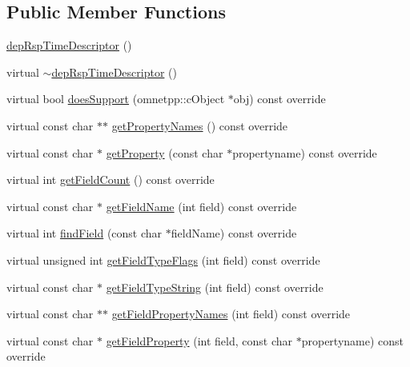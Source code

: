 \subsection*{Public Member Functions}
\begin{DoxyCompactItemize}
\item 
\hyperlink{classdep_rsp_time_descriptor_a1c9b594074be83beb7009019d66da91e}{dep\+Rsp\+Time\+Descriptor} ()
\item 
virtual \hyperlink{classdep_rsp_time_descriptor_a0cb36f001ae3e47a6d6156b8c7e66e19}{$\sim$dep\+Rsp\+Time\+Descriptor} ()
\item 
virtual bool \hyperlink{classdep_rsp_time_descriptor_ac514b2445c49b0a2fde22c730bdd8155}{does\+Support} (omnetpp\+::c\+Object $\ast$obj) const override
\item 
virtual const char $\ast$$\ast$ \hyperlink{classdep_rsp_time_descriptor_a3909adf8b159cd8da2cdb9aa135a77ba}{get\+Property\+Names} () const override
\item 
virtual const char $\ast$ \hyperlink{classdep_rsp_time_descriptor_a2426bb36989259be75b4ac3c7c18af5b}{get\+Property} (const char $\ast$propertyname) const override
\item 
virtual int \hyperlink{classdep_rsp_time_descriptor_ab44ba5e8986e63b20c2ced23f47a011c}{get\+Field\+Count} () const override
\item 
virtual const char $\ast$ \hyperlink{classdep_rsp_time_descriptor_a764ef69505cdeca4cefbda8aa3820bc3}{get\+Field\+Name} (int field) const override
\item 
virtual int \hyperlink{classdep_rsp_time_descriptor_aa50291bed26663e0840e5a9278af4145}{find\+Field} (const char $\ast$field\+Name) const override
\item 
virtual unsigned int \hyperlink{classdep_rsp_time_descriptor_aefc601d75b14b0e264693c32f35b084e}{get\+Field\+Type\+Flags} (int field) const override
\item 
virtual const char $\ast$ \hyperlink{classdep_rsp_time_descriptor_a230884891fa25dd60490fbf1b72dd5ab}{get\+Field\+Type\+String} (int field) const override
\item 
virtual const char $\ast$$\ast$ \hyperlink{classdep_rsp_time_descriptor_a35ad7064d9ca791511a1d570f957cb34}{get\+Field\+Property\+Names} (int field) const override
\item 
virtual const char $\ast$ \hyperlink{classdep_rsp_time_descriptor_a7c5adef7085e1e13c680e060fcdfd5a2}{get\+Field\+Property} (int field, const char $\ast$propertyname) const override
\item 

\end{DoxyCompactItemize}
